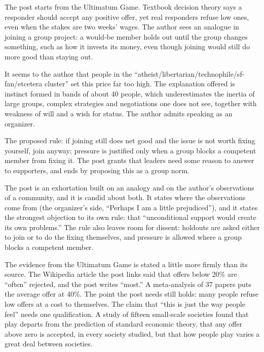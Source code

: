 \begin{afterword}
\summaryhead

The post starts from the Ultimatum Game. Textbook decision theory says a responder should accept any positive offer, yet real responders refuse low ones, even when the stakes are two weeks' wages. The author sees an analogue in joining a group project: a would-be member holds out until the group changes something, such as how it invests its money, even though joining would still do more good than staying out.

It seems to the author that people in the ``atheist\slash{}libertarian\slash{}technophile/sf-fan/etcetera cluster'' set this price far too high. The explanation offered is instinct formed in bands of about 40 people, which underestimates the inertia of large groups, complex strategies and negotiations one does not see, together with weakness of will and a wish for status. The author admits speaking as an organizer.

The proposed rule: if joining still does net good and the issue is not worth fixing yourself, join anyway; pressure is justified only when a group blocks a competent member from fixing it. The post grants that leaders need some reason to answer to supporters, and ends by proposing this as a group norm.

\responsehead

The post is an exhortation built on an analogy and on the author's observations of a community, and it is candid about both. It states where the observations come from (the organizer's side, ``Perhaps I am a little prejudiced''), and it states the strongest objection to its own rule: that ``unconditional support would create its own problems.'' The rule also leaves room for dissent: holdouts are asked either to join or to do the fixing themselves, and pressure is allowed where a group blocks a competent member.

The evidence from the Ultimatum Game is stated a little more firmly than its source. The Wikipedia article the post links said that offers below 20\% are ``often'' rejected, and the post writes ``most.'' A meta-analysis of 37 papers puts the average offer at 40\%. The point the post needs still holds: many people refuse low offers at a cost to themselves. The claim that ``this is just the way people feel'' needs one qualification. A study of fifteen small-scale societies found that play departs from the prediction of standard economic theory, that any offer above zero is accepted, in every society studied, but that how people play varies a great deal between societies.


\end{afterword}
